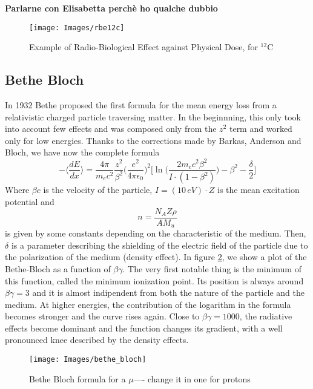 \documentclass[12pt, a4paper, twoside]{book}
\begin{document}
\textbf{Parlarne con Elisabetta perchè ho qualche dubbio}

\begin{figure}[!h]
\texttt{[image: Images/rbe12c]}
\caption{Example of Radio-Biological Effect against Physical Dose, for $^{12}$C}
\label{fig:rbe12c}
\end{figure}



\subsection{Bethe Bloch}
In 1932 Bethe proposed the first formula for the mean energy loss from a relativistic charged particle traversing matter. In the beginnning, this only took into account few effects and was composed only from the $z^2$ term and worked only for low energies. Thanks to the corrections made by Barkas, Anderson and Bloch, we have now the complete formula
\[
-\bigg\langle\frac{dE}{dx}\bigg\rangle= \frac{4\pi}{m_ec^2}\frac{z^2}{\beta^2}\bigg(\frac{e^2}{4\pi\epsilon_0} \bigg)^2\bigg[\ln{\bigg(\frac{2m_ec^2\beta^2}{I\cdot(1-\beta^2)}\bigg)}-\beta^2 -\frac{\delta}{2}\bigg]
\]
Where $\beta c$ is the velocity of the particle, $I=(10\,eV)\cdot Z$ is the mean excitation potential and 
\[
n = \frac{N_AZ\rho}{AM_u}
\]
is given by some constants depending on the characteristic of the medium. Then, $\delta$ is a parameter describing the shielding of the electric field of the particle due to the polarization of the medium (density effect).
In figure \ref{fig:BB}, we show a plot of the Bethe-Bloch as a function of $\beta\gamma$. The very first notable thing is the minimum of this function, called the minimum ionization point. Its position is always around $\beta\gamma=3$ and it is almost indipendent from both the nature of the particle and the medium. At higher energies, the contribution of the logarithm in the formula becomes stronger and the curve rises again. Close to $\beta\gamma=1000$, the radiative effects become dominant and the function changes its gradient, with a well pronounced knee described by the density effects.
\begin{figure}[!ht]
{\texttt{[image: Images/bethe\_bloch]}}
\caption{Bethe Bloch formula for a $\mu$---- change it in one for protons}
\label{fig:BB}
\end{figure}
\end{document}
